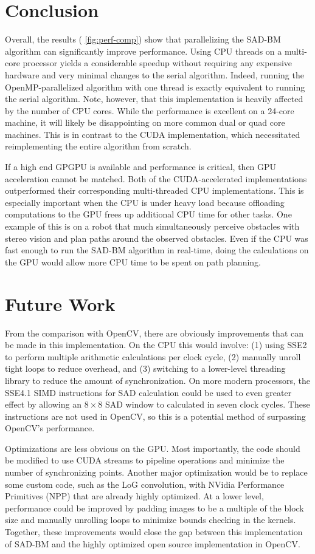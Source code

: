 \documentclass{article}
\let\orgautoref\autoref
\providecommand{\Autoref}
        {\def\equationautorefname{Equation}%
         \def\figureautorefname{Figure}%
         \def\subfigureautorefname{Figure}%
         \def\Itemautorefname{Item}%
         \def\tableautorefname{Table}%
         \def\sectionautorefname{Section}%
         \def\subsectionautorefname{Section}%
         \def\subsubsectionautorefname{Section}%
         \def\chapterautorefname{Section}%
         \def\partautorefname{Part}%
         \orgautoref}
\begin{document}
\section{Conclusion}
\label{sec:conc}
Overall, the results (\Autoref{fig:perf-comp}) show that parallelizing the
SAD-BM algorithm can significantly improve performance. Using CPU threads on a
multi-core processor yields a considerable speedup without requiring any
expensive hardware and very minimal changes to the serial algorithm. Indeed,
running the OpenMP-parallelized algorithm with one thread is exactly equivalent
to running the serial algorithm. Note, however, that this implementation is
heavily affected by the number of CPU cores. While the performance is excellent
on a 24-core machine, it will likely be disappointing on more common dual or
quad core machines. This is in contrast to the CUDA implementation, which
necessitated reimplementing the entire algorithm from scratch.

If a high end GPGPU is available and performance is critical, then GPU
acceleration cannot be matched. Both of the CUDA-accelerated implementations
outperformed their corresponding multi-threaded CPU implementations. This is
especially important when the CPU is under heavy load because offloading
computations to the GPU frees up additional CPU time for other tasks. One
example of this is on a robot that much simultaneously perceive obstacles with
stereo vision and plan paths around the observed obstacles. Even if the CPU was
fast enough to run the SAD-BM algorithm in real-time, doing the calculations on
the GPU would allow more CPU time to be spent on path planning.

\section{Future Work}
\label{sec:future}
From the comparison with OpenCV, there are obviously improvements that can be
made in this implementation. On the CPU this would involve: (1) using SSE2 to
perform multiple arithmetic calculations per clock cycle, (2) manually unroll
tight loops to reduce overhead, and (3) switching to a lower-level threading
library to reduce the amount of synchronization. On more modern processors, the
SSE4.1 SIMD instructions for SAD calculation could be used to even greater
effect by allowing an $8 \times 8$ SAD window to calculated in seven clock
cycles. These instructions are not used in OpenCV, so this is a potential
method of surpassing OpenCV's performance.

Optimizations are less obvious on the GPU. Most importantly, the code should be
modified to use CUDA streams to pipeline operations and minimize the number of
synchronizing points. Another major optimization would be to replace some
custom code, such as the LoG convolution, with NVidia Performance Primitives
(NPP) that are already highly optimized. At a lower level, performance could be
improved by padding images to be a multiple of the block size and manually
unrolling loops to minimize bounds checking in the kernels. Together, these
improvements would close the gap between this implementation of SAD-BM and the
highly optimized open source implementation in OpenCV.

{}

\end{document}

